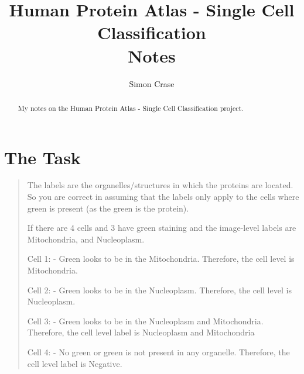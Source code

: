 \documentclass[]{article}
\title{Human Protein Atlas - Single Cell Classification\\Notes}
\author{Simon Crase}
\begin{document}
\maketitle


\begin{abstract}
My notes on the Human Protein Atlas - Single Cell Classification project.
\end{abstract}
\tableofcontents
\listoftables
\listoffigures
\section{The Task}

\begin{quotation}
	The labels are the organelles/structures in which the proteins are located. So you are correct in assuming that the labels only apply to the cells where green is present (as the green is the protein).
	
	If there are 4 cells and 3 have green staining and the image-level labels are Mitochondria, and Nucleoplasm.
	
	Cell 1:
	- Green looks to be in the Mitochondria. Therefore, the cell level is Mitochondria.
	
	Cell 2:
	- Green looks to be in the Nucleoplasm. Therefore, the cell level is Nucleoplasm.
	
	Cell 3:
	- Green looks to be in the Nucleoplasm and Mitochondria. Therefore, the cell level label is Nucleoplasm and Mitochondria
	
	Cell 4:
	- No green or green is not present in any organelle. Therefore, the cell level label is Negative. \cite{schettler2021}
\end{quotation}
\end{document}
